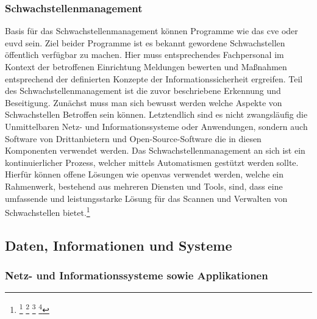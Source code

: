 \documentclass[11pt,a4paper,hidelinks]{article}   %
\begin{document}
            \subsubsection{Schwachstellenmanagement}
            Basis für das Schwachstellenmanagement können Programme wie das \gls{cve} oder \gls{euvd} sein. Ziel beider Programme ist es bekannt gewordene Schwachstellen öffentlich verfügbar zu machen. Hier muss entsprechendes Fachpersonal im Kontext der betroffenen Einrichtung Meldungen bewerten und Maßnahmen entsprechend der definierten Konzepte der Informationssicherheit ergreifen. Teil des Schwachstellenmanagement ist die zuvor beschriebene Erkennung und Beseitigung. Zunächst muss man sich bewusst werden welche Aspekte von Schwachstellen Betroffen sein können. Letztendlich sind es nicht zwangsläufig die Unmittelbaren Netz- und Informationssysteme oder Anwendungen, sondern auch Software von Drittanbietern und Open-Source-Software die in diesen Komponenten verwendet werden. Das Schwachstellenmanagement an sich ist ein kontinuierlicher Prozess, welcher mittels Automatismen gestützt werden sollte. Hierfür können offene Lösungen wie \gls{openvas} verwendet werden, welche ein Rahmenwerk, bestehend aus mehreren Diensten und Tools, sind, dass eine umfassende und leistungsstarke Lösung für das Scannen und Verwalten von Schwachstellen bietet.\footnote{
                \footcite[][EU Vulnerability Database (EUVD)]{MISSING}
                \footcite[Vgl. S. 6 - 8][]{978-1-63081-938-5}
                \footcite[Vgl. S. 1 - 9, 14][]{9781394221226}
                \footcite[Vgl. S. 48][]{9781484242698}
            }
        \subsection{Daten, Informationen und Systeme}
            \subsubsection{Netz- und Informationssysteme sowie Applikationen}
\end{document}

